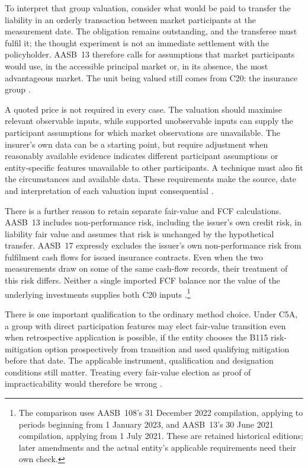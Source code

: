 To interpret that group valuation, consider what would be paid to transfer
the liability in an orderly transaction between market participants at the
measurement date. The obligation remains outstanding, and the transferee must
fulfil it; the thought experiment is not an immediate settlement with the
policyholder. AASB~13 therefore calls for assumptions that market participants
would use, in the accessible principal market or, in its absence, the most
advantageous market. The unit being valued still comes from C20: the insurance
group \citep[paragraphs~2--3, 9, 13--24 and 34]{aasb13comp2021}.

A quoted price is not required in every case. The valuation should maximise
relevant observable inputs, while supported unobservable inputs can supply
the participant assumptions for which market observations are unavailable.
The insurer's own data can be a starting point, but require adjustment when
reasonably available evidence indicates different participant assumptions or
entity-specific features unavailable to other participants. A technique must
also fit the circumstances and available data. These requirements make the
source, date and interpretation of each valuation input consequential
\citep[paragraphs~61--67 and 87--89]{aasb13comp2021}.

There is a further reason to retain separate fair-value and FCF calculations.
AASB~13 includes non-performance risk, including the issuer's own credit
risk, in liability fair value and assumes that risk is unchanged by the
hypothetical transfer. AASB~17 expressly excludes the issuer's own
non-performance risk from fulfilment cash flows for issued insurance contracts.
Even when the two measurements draw on some of the same cash-flow records,
their treatment of this risk differs. Neither a single imported FCF balance
nor the value of the underlying investments supplies both C20 inputs
\citep[paragraphs~42--44]{aasb13comp2021}
\citep[paragraph~31]{aasb17}.\footnote{The comparison uses AASB~108's
31 December 2022 compilation, applying to periods beginning from 1 January
2023, and AASB~13's 30 June 2021 compilation, applying from 1 July 2021.
These are retained historical editions; later amendments and the actual
entity's applicable requirements need their own check.}

\clearpage
There is one important qualification to the ordinary method choice. Under
C5A, a group with direct participation features may elect fair-value transition
even when retrospective application is possible, if the entity chooses the
B115 risk-mitigation option prospectively from transition and used qualifying
mitigation before that date. The applicable instrument, qualification and
designation conditions still matter. Treating every fair-value election as
proof of impracticability would therefore be wrong
\citep[paragraphs C3(b), C5A and B115--B118]{aasb17}.

